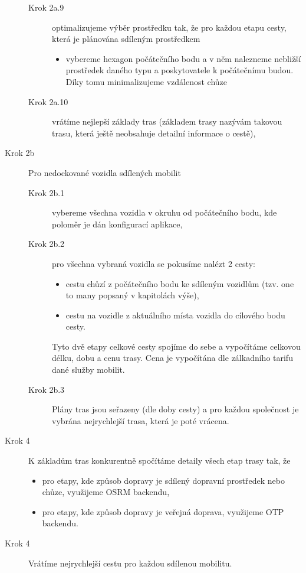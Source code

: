 \documentclass[thesis=M,czech]{FITthesis}[2019/12/23]
\theoremstyle{plain}
\theoremstyle{definition}
\begin{document}
\begin{description}
\begin{description}
		\item [Krok 2a.9] optimalizujeme výběr prostředku tak, že pro každou etapu cesty, která je plánována sdíleným prostředkem
		\begin{itemize}
			\item vybereme hexagon počátečního bodu a v něm nalezneme nebližší prostředek daného typu a poskytovatele k počátečnímu budou. Díky tomu minimalizujeme vzdálenost chůze
		\end{itemize}

		\item [Krok 2a.10] vrátíme nejlepší základy tras (základem trasy nazývám takovou trasu, která ještě neobsahuje detailní informace o cestě),
	\end{description}
	\item [Krok 2b] Pro nedockované vozidla sdílených mobilit
	\begin{description}
		\item [Krok 2b.1] vybereme všechna vozidla v okruhu od počátečního bodu, kde poloměr je dán konfigurací aplikace,
		\item [Krok 2b.2] pro všechna vybraná vozidla se pokusíme nalézt 2 cesty:
		\begin{itemize}
			\item cestu chůzí z počátečního bodu ke sdíleným vozidlům (tzv. one to many popsaný v kapitolách výše),
			\item cestu na vozidle z aktuálního místa vozidla do cílového bodu cesty.
		\end{itemize}
		Tyto dvě etapy celkové cesty spojíme do sebe a vypočítáme celkovou délku, dobu a cenu trasy. Cena je vypočítána dle zálkadního tarifu dané služby mobilit.
		\item [Krok 2b.3] Plány tras jsou seřazeny (dle doby cesty) a pro každou společnost je vybrána nejrychlejší trasa, která je poté vrácena.
	
	\end{description}
	 \item [Krok 4] K základům tras konkurentně spočítáme detaily všech etap trasy tak, že
		\begin{itemize}
			\item pro etapy, kde způsob dopravy je sdílený dopravní prostředek nebo chůze, využijeme OSRM backendu,
			\item pro etapy, kde způsob dopravy je veřejná doprava, využijeme OTP backendu.
		\end{itemize}
	\item [Krok 4]Vrátíme nejrychlejší cestu pro každou sdílenou mobilitu.


\end{description}
\end{document}
